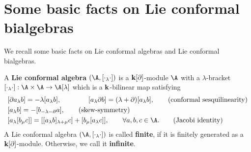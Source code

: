 \documentclass[12pt]{amsart}
\begin{document}
    \section{Some basic facts on Lie conformal bialgebras}\label{2}%
    We  recall some basic facts on Lie conformal algebras and Lie conformal bialgebras.


    \begin{definition}\cite{K1}\label{lca}
        A {\bf Lie conformal algebra} $(\A,[\cdot_\lambda\cdot])$ is a ${\bf k}[\partial]$-module $\A$ with a $\lambda$-bracket $[\cdot_\lambda\cdot]:\A\times \A\rightarrow \A[\lambda]$ which is a
        ${\bf k}$-bilinear map  satisfying
        \begin{align}
            &[\partial a_\lambda b]=-\lambda[a_\lambda b],   \quad\quad\quad\quad   [ a_\lambda \partial b]=(\lambda+\partial)[a_\lambda b],\tag{conformal sesquilinearity} \label{cs}\\
            &[a_\lambda b]=-[b_{-\lambda-\partial}a],\tag{skew-symmetry}\\
            &[a_\lambda[b_\mu c]]=[[a_\lambda b]_{\lambda+\mu}c]+[b_\mu[a_\lambda c]], \qquad \forall a,b,c\in \A.  \tag{Jacobi identity}   \label{li}
        \end{align}
        A Lie conformal algebra $(\A,[\cdot_\lambda\cdot])$ is called {\bf finite}, if it is finitely generated as a ${\bf k}[\partial]$-module. Otherwise, we call it {\bf infinite}.
    \end{definition}
\end{document}
